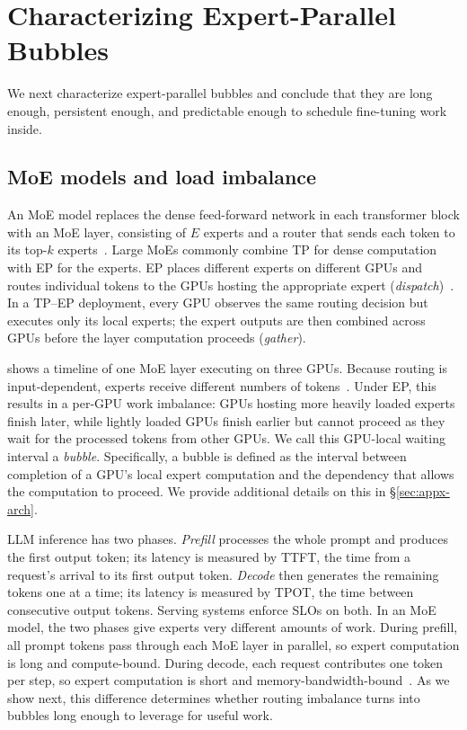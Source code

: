 \section{Characterizing Expert-Parallel Bubbles}
\label{sec:characterization}

We next characterize expert-parallel bubbles and conclude that they are long enough, persistent enough, and predictable enough to schedule fine-tuning work inside.

\subsection{\ac{MoE} models and load imbalance}
An \ac{MoE} model replaces the dense feed-forward network in each transformer block with an \ac{MoE} layer, consisting of $E$ experts and a router that sends each token to its top-$k$ experts~\cite{switch,gshard}.
Large \acp{MoE} commonly combine \ac{TP} for dense computation with \acf{EP} for the experts.
\ac{EP} places different experts on different GPUs and routes individual tokens to the GPUs hosting the appropriate expert (\emph{dispatch})~\cite{deepseekv3,vllm-ep-rfc}.
In a \ac{TP}--\ac{EP} deployment, every GPU observes the same routing decision but executes only its local experts; the expert outputs are then combined across GPUs before the layer computation proceeds (\emph{gather}).

 shows a timeline of one \ac{MoE} layer executing on three GPUs.
Because routing is input-dependent, experts receive different numbers of tokens~\cite{switch,expertchoice,deepseekv3}.
Under \ac{EP}, this results in a per-GPU work imbalance: GPUs hosting more heavily loaded experts finish later, while lightly loaded GPUs finish earlier but cannot proceed as they wait for the processed tokens from other GPUs.
We call this GPU-local waiting interval a \emph{bubble}.
Specifically, a bubble is defined as the interval between completion of a GPU's local expert computation and the dependency that allows the computation to proceed.
We provide additional details on this in \S\ref{sec:appx-arch}.

\Ac{LLM} inference has two phases.
\emph{Prefill} processes the whole prompt and produces the first output token; its latency is measured by \ac{TTFT}, the time from a request's arrival to its first output token.
\emph{Decode} then generates the remaining tokens one at a time; its latency is measured by \ac{TPOT}, the time between consecutive output tokens.
Serving systems enforce \acp{SLO} on both.
In an \ac{MoE} model, the two phases give experts very different amounts of work.
During prefill, all prompt tokens pass through each \ac{MoE} layer in parallel, so expert computation is long and compute-bound.
During decode, each request contributes one token per step, so expert computation is short and memory-bandwidth-bound~\cite{orca,vllm}.
As we show next, this difference determines whether routing imbalance turns into bubbles long enough to leverage for useful work.

